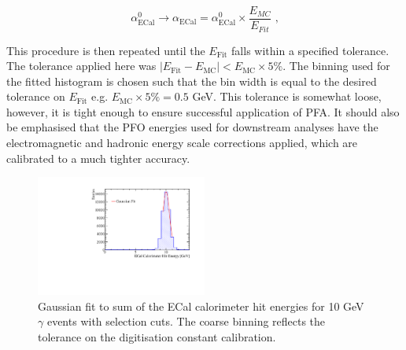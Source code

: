 \begin{equation}
\alpha^{0}_{\text{ECal}} \rightarrow \alpha_{\text{ECal}} = \alpha^{0}_{\text{ECal}} \times \frac{E_{MC}}{E_{Fit}}\text{ ,}
\end{equation}

This procedure is then repeated until the $E_{\text{Fit}}$ falls within a specified tolerance.  The tolerance applied here was $|E_{\text{Fit}} - E_{\text{MC}}| < E_{\text{MC}} \times 5 \%$.  The binning used for the fitted histogram is chosen such that the bin width is equal to the desired tolerance on $E_{\text{Fit}}$ e.g. $E_{\text{MC}} \times 5 \% = 0.5$ GeV.  This tolerance is somewhat loose, however, it is tight enough to ensure successful application of PFA.  It should also be emphasised that the PFO energies used for downstream analyses have the electromagnetic and hadronic energy scale corrections applied, which are calibrated to a much tighter accuracy.

\begin{figure}[h!]
\includegraphics[width=0.5\textwidth]{EnergyEstimators/Plots/Calibration/Digitsation/ECal/DigitisationECalFit.pdf}
\caption[Gaussian fit to sum of the ECal calorimeter hit energies for 10 GeV $\gamma$ events with selection cuts.  The coarse binning reflects the tolerance on the digitisation constant calibration.]{Gaussian fit to sum of the ECal calorimeter hit energies for 10 GeV $\gamma$ events with selection cuts.  The coarse binning reflects the tolerance on the digitisation constant calibration.}
\label{fig:ecaldigifit}
\end{figure}


